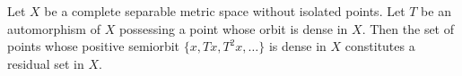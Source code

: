 Let $X$ be a complete separable metric space without isolated points. Let $T$ be an automorphism of $X$ possessing a point whose orbit is dense in $X$. Then the set of points whose positive semiorbit $\{x, Tx, T^2x, \ldots\}$ is dense in $X$ constitutes a residual set in $X$.
